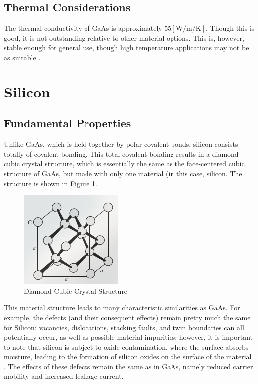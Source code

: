 \documentclass[conference]{IEEEtran}
\begin{document}
\subsection{Thermal Considerations}

The thermal conductivity of GaAs is approximately $55[\si{\watt\per\meter\per\kelvin}]$. Though this is good, it is not outstanding relative to other material options. This is, however, stable enough for general use, though high temperature applications may not be as suitable \cite{GaAsDOE}.

\section{Silicon}

\subsection{Fundamental Properties}

Unlike GaAs, which is held together by polar covalent bonds, silicon consists totally of covalent bonding. This total covalent bonding results in a diamond cubic crystal structure, which is essentially the same as the face-centered cubic structure of GaAs, but made with only one material (in this case, silicon. The structure is shown in Figure \ref{fig:4}.

  \begin{figure}[h]
    \centering
    \includegraphics[width=.2\textwidth]{Figures/DCC}
    \caption{Diamond Cubic Crystal Structure \cite[Page 58]{textbook}}
    \label{fig:4}
  \end{figure}

  This material structure leads to many characteristic similarities as GaAs. For example, the defects (and their consequent effects) remain pretty much the same for Silicon: vacancies, dislocations, stacking faults, and twin boundaries can all potentially occur, as well as possible material impurities; however, it is important to note that silicon is subject to oxide contamination, where the surface absorbs moisture, leading to the formation of silicon oxides on the surface of the material \cite{SDef}. The effects of these defects remain the same as in GaAs, namely reduced carrier mobility and increased leakage current.
\end{document}
